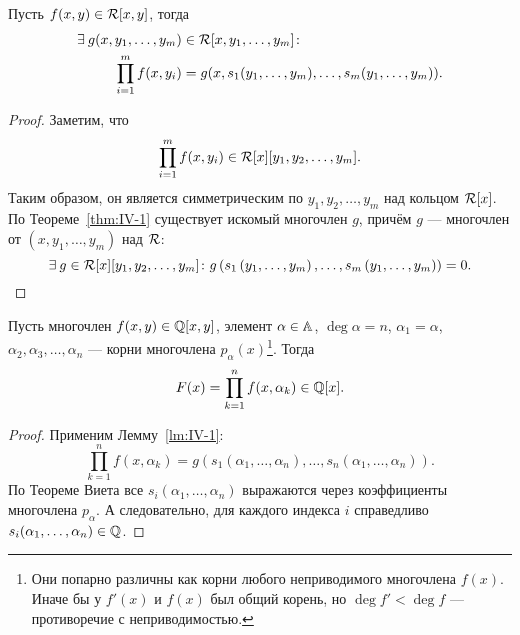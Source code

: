 \begin{nlemma}
\label{lm:IV-1}
    Пусть $f(x,y) \in \rr[x, y]$, тогда
    \begin{align*}
        \exists g(x, y_1, \dots, y_m) &\in \rr[x, y_1, \dots, y_m]\colon \\
        \prod_{i=1}^{m} f(x, y_i) &= g(x, s_1(y_1, \dots, y_m), \dots, s_m(y_1, \dots, y_m)).
    \end{align*}
\end{nlemma}
\begin{proof}
    Заметим, что
    \[
        \prod_{i=1}^{m} f(x, y_i) \in \rr[x][y_1, y_2, \dots, y_m].
    \]
    Таким образом, он является симметрическим по $y_1, y_2, \dots, y_m$ над кольцом $\rr[x]$. По Теореме~\ref{thm:IV-1} существует искомый многочлен $g$, причём $g$ --- многочлен от $(x, y_1, \dots, y_m)$ над $\rr$:
    \[
        \exists g \in \rr[x][y_1, y_2, \dots, y_m]\colon g\left( s_1\left( y_1, \dots, y_m \right), \dots, s_m\left( y_1, \dots, y_m \right) \right) = 0.
    \]
\end{proof}

\begin{nlemma}
\label{lm:IV-2}
    Пусть многочлен $f(x,y) \in \QQ[x, y]$, элемент $\alpha \in \AA$, $\deg{\alpha} = n$, $\alpha_1 = \alpha$, $\alpha_2, \alpha_3, \dots, \alpha_n$ --- корни многочлена $p_\alpha(x)$\footnote{Они попарно различны как корни любого неприводимого многочлена $f(x)$. Иначе бы у $f'(x)$ и $f(x)$ был общий корень, но $\deg{f'} < \deg{f}$ --- противоречие с неприводимостью.}. Тогда 
    \[
        F(x) = \prod_{k=1}^n f(x, \alpha_k) \in \QQ[x].
    \]
\end{nlemma}
\begin{proof}
    Применим Лемму~\ref{lm:IV-1}:
    \[
        \prod_{k=1}^n f(x, \alpha_k) = g\left( s_1\left( \alpha_1, \dots, \alpha_n \right), \dots, s_n\left( \alpha_1, \dots, \alpha_n \right) \right).
    \]
    По Теореме Виета все $s_i(\alpha_1,\dots,\alpha_n)$ выражаются через коэффициенты многочлена $p_\alpha$. А следовательно, для каждого индекса $i$ справедливо $s_i(\alpha_1, \dots, \alpha_n) \in \QQ$.
\end{proof}

